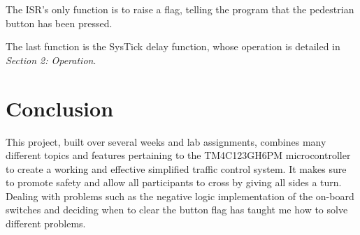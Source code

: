 \documentclass{article}
\begin{document}
The ISR's only function is to raise a flag, telling the program
that the pedestrian button has been pressed.

The last function is the SysTick delay function, whose
operation is detailed in \emph{Section 2: Operation}.

\section{Conclusion} This project, built over several weeks
and lab assignments, combines many different topics and
features pertaining to the TM4C123GH6PM microcontroller to
create a working and effective simplified traffic control
system. It makes sure to promote safety and allow all
participants to cross by giving all sides a turn. Dealing with
problems such as the negative logic implementation of the
on-board switches and deciding when to clear the button
flag has taught me how to solve different problems.
\end{document}
